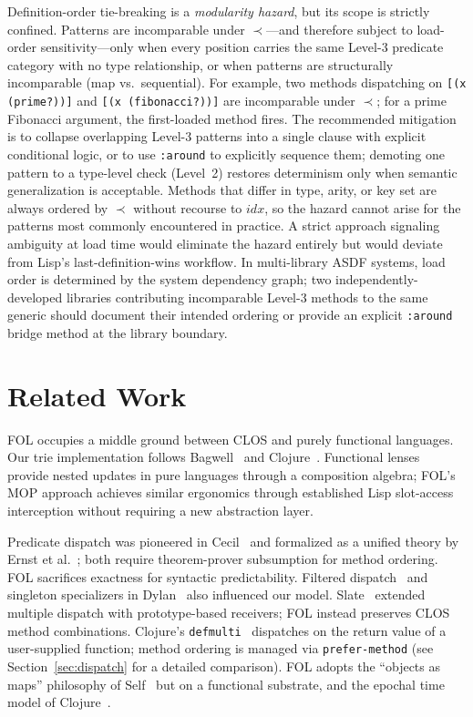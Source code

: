\documentclass[sigconf,nonacm]{acmart}
\begin{document}
Definition-order tie-breaking is a \textit{modularity hazard}, but its scope is strictly confined. Patterns are incomparable under $\prec$---and therefore subject to load-order sensitivity---only when every position carries the same Level-3 predicate category with no type relationship, or when patterns are structurally incomparable (map vs.\ sequential). For example, two methods dispatching on \texttt{[(x (prime?))]} and \texttt{[(x (fibonacci?))]} are incomparable under $\prec$; for a prime Fibonacci argument, the first-loaded method fires. The recommended mitigation is to collapse overlapping Level-3 patterns into a single clause with explicit conditional logic, or to use \texttt{:around} to explicitly sequence them; demoting one pattern to a type-level check (Level~2) restores determinism only when semantic generalization is acceptable. Methods that differ in type, arity, or key set are always ordered by $\prec$ without recourse to $\textit{idx}$, so the hazard cannot arise for the patterns most commonly encountered in practice. A strict approach signaling ambiguity at load time would eliminate the hazard entirely but would deviate from Lisp's last-definition-wins workflow. In multi-library ASDF systems, load order is determined by the system dependency graph; two independently-developed libraries contributing incomparable Level-3 methods to the same generic should document their intended ordering or provide an explicit \texttt{:around} bridge method at the library boundary.

\section{Related Work}
\label{sec:related}

FOL occupies a middle ground between CLOS and purely functional languages. Our trie implementation follows Bagwell~\cite{Bagwell2000} and Clojure~\cite{Hickey2008}. Functional lenses~\cite{Kmett2012} provide nested updates in pure languages through a composition algebra; FOL's MOP approach achieves similar ergonomics through established Lisp slot-access interception without requiring a new abstraction layer.

Predicate dispatch was pioneered in Cecil~\cite{Chambers1993} and formalized as a unified theory by Ernst et al.~\cite{Ernst1998}; both require theorem-prover subsumption for method ordering. FOL sacrifices exactness for syntactic predictability. Filtered dispatch~\cite{Orleans2002} and singleton specializers in Dylan~\cite{Apple1992} also influenced our model. Slate~\cite{Salzman2005} extended multiple dispatch with prototype-based receivers; FOL instead preserves CLOS method combinations. Clojure's \texttt{defmulti}~\cite{Hickey2008} dispatches on the return value of a user-supplied function; method ordering is managed via \texttt{prefer-method} (see Section~\ref{sec:dispatch} for a detailed comparison). FOL adopts the ``objects as maps'' philosophy of Self~\cite{Ungar1987} but on a functional substrate, and the epochal time model of Clojure~\cite{Hickey2009}.
\end{document}
